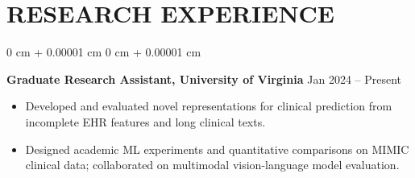 \documentclass[10pt, letterpaper]{article}
\newenvironment{highlights}{
    \begin{itemize}[
        topsep=0.10 cm,
        parsep=0.10 cm,
        partopsep=0pt,
        itemsep=0pt,
        leftmargin=0 cm + 10pt
    ]
}{
    \end{itemize}
} %
\newenvironment{onecolentry}{
    \begin{adjustwidth}{
        0 cm + 0.00001 cm
    }{
        0 cm + 0.00001 cm
    }
}{
    \end{adjustwidth}
} %
\begin{document}
\section{RESEARCH EXPERIENCE}
\begin{onecolentry}
\textbf{Graduate Research Assistant, University of Virginia} \hfill Jan 2024 -- Present
\begin{highlights}
\item Developed and evaluated novel representations for clinical prediction from incomplete EHR features and long clinical texts.
\item Designed academic ML experiments and quantitative comparisons on MIMIC clinical data; collaborated on multimodal vision-language model evaluation.
\end{highlights}
\end{onecolentry}
\end{document}
